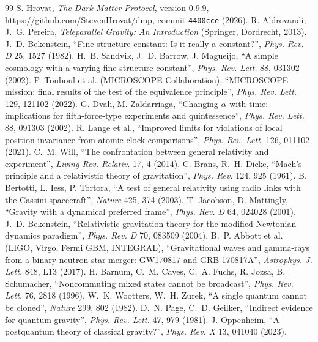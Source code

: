 \documentclass[11pt,a4paper]{article}
\theoremstyle{definition}
\theoremstyle{remark}
\begin{document}
\begin{thebibliography}{99}\small
{} S. Hrovat, \emph{The Dark Matter Protocol}, version 0.9.9, \url{https://github.com/StevenHrovat/dmp}, commit
\texttt{4400cce} (2026).
 R. Aldrovandi, J.~G. Pereira, \emph{Teleparallel Gravity: An Introduction} (Springer, Dordrecht, 2013).
 J.~D. Bekenstein, ``Fine-structure constant: Is it really a constant?'', \emph{Phys. Rev. D} 25, 1527 (1982).
 H.~B. Sandvik, J.~D. Barrow, J. Magueijo, ``A simple cosmology with a varying fine structure constant'', \emph{Phys. Rev.
Lett.} 88, 031302 (2002).
 P. Touboul et al. (MICROSCOPE Collaboration), ``MICROSCOPE mission: final results of the test of the equivalence
principle'', \emph{Phys. Rev. Lett.} 129, 121102 (2022).
 G. Dvali, M. Zaldarriaga, ``Changing $\alpha$ with time: implications for fifth-force-type experiments and quintessence'',
\emph{Phys. Rev. Lett.} 88, 091303 (2002).
 R. Lange et al., ``Improved limits for violations of local position invariance from atomic clock comparisons'',
\emph{Phys. Rev. Lett.} 126, 011102 (2021).
 C.~M. Will, ``The confrontation between general relativity and experiment'', \emph{Living Rev. Relativ.} 17, 4 (2014).
 C. Brans, R.~H. Dicke, ``Mach's principle and a relativistic theory of gravitation'', \emph{Phys. Rev.} 124, 925 (1961).
 B. Bertotti, L. Iess, P. Tortora, ``A test of general relativity using radio links with the Cassini spacecraft'',
\emph{Nature} 425, 374 (2003).
 T. Jacobson, D. Mattingly, ``Gravity with a dynamical preferred frame'', \emph{Phys. Rev. D} 64, 024028 (2001).
 J.~D. Bekenstein, ``Relativistic gravitation theory for the modified Newtonian dynamics paradigm'', \emph{Phys. Rev. D}
70, 083509 (2004).
 B.~P. Abbott et al. (LIGO, Virgo, Fermi GBM, INTEGRAL), ``Gravitational waves and gamma-rays from a binary neutron
star merger: GW170817 and GRB 170817A'', \emph{Astrophys. J. Lett.} 848, L13 (2017).
 H. Barnum, C.~M. Caves, C.~A. Fuchs, R. Jozsa, B. Schumacher, ``Noncommuting mixed states cannot be broadcast'',
\emph{Phys. Rev. Lett.} 76, 2818 (1996).
 W.~K. Wootters, W.~H. Zurek, ``A single quantum cannot be cloned'', \emph{Nature} 299, 802 (1982).
 D.~N. Page, C.~D. Geilker, ``Indirect evidence for quantum gravity'', \emph{Phys. Rev. Lett.} 47, 979 (1981).
 J. Oppenheim, ``A postquantum theory of classical gravity?'', \emph{Phys. Rev. X} 13, 041040 (2023).

\end{thebibliography}
\end{document}
